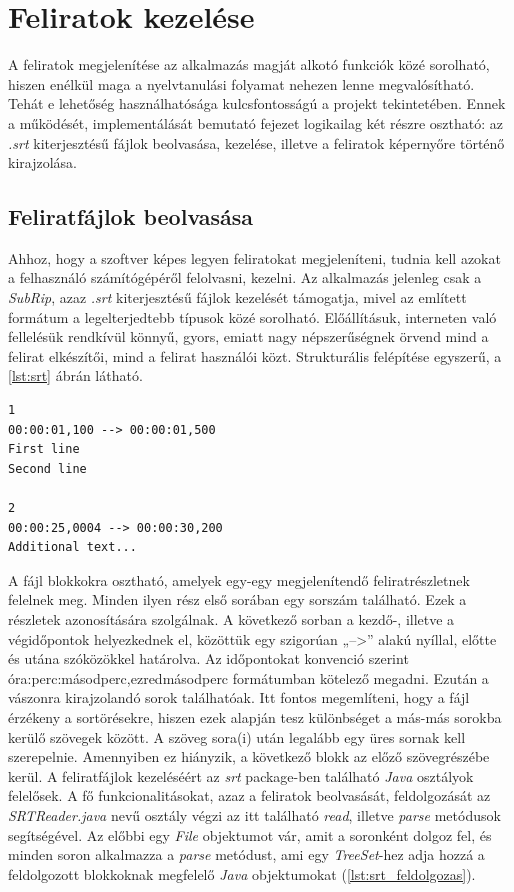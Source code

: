 \section{Feliratok kezelése}
A feliratok megjelenítése az alkalmazás magját alkotó funkciók közé sorolható, hiszen enélkül maga a nyelvtanulási folyamat nehezen lenne megvalósítható. Tehát e lehetőség használhatósága kulcsfontosságú a projekt tekintetében. Ennek a működését, implementálását bemutató fejezet logikailag két részre osztható: az \textit{.srt} kiterjesztésű fájlok beolvasása, kezelése, illetve a feliratok képernyőre történő kirajzolása.

\subsection{Feliratfájlok beolvasása}
Ahhoz, hogy a szoftver képes legyen feliratokat megjeleníteni, tudnia kell azokat a felhasználó számítógépéről felolvasni, kezelni. Az alkalmazás jelenleg csak a \textit{SubRip}, azaz \textit{.srt} kiterjesztésű fájlok kezelését támogatja, mivel az említett formátum a legelterjedtebb típusok közé sorolható. Előállításuk, interneten való fellelésük rendkívül könnyű, gyors, emiatt nagy népszerűségnek örvend mind a felirat elkészítői, mind a felirat használói közt. Strukturális felépítése egyszerű, a \ref{lst:srt} ábrán látható.


\begin{verbatim}
1
00:00:01,100 --> 00:00:01,500
First line
Second line
 
2 
00:00:25,0004 --> 00:00:30,200 
Additional text...
\end{verbatim}

A fájl blokkokra osztható, amelyek egy-egy megjelenítendő feliratrészletnek felelnek meg. Minden ilyen rész első sorában egy sorszám található. Ezek a részletek azonosítására szolgálnak. A következő sorban a kezdő-, illetve a végidőpontok helyezkednek el, közöttük egy szigorúan „-->” alakú nyíllal, előtte és utána szóközökkel határolva. Az időpontokat konvenció szerint óra:perc:másodperc,ezredmásodperc formátumban kötelező megadni. Ezután a vászonra kirajzolandó sorok találhatóak. Itt fontos megemlíteni, hogy a fájl érzékeny a sortörésekre, hiszen ezek alapján tesz különbséget a más-más sorokba kerülő szövegek között. A szöveg sora(i) után legalább egy üres sornak kell szerepelnie. Amennyiben ez hiányzik, a következő blokk az előző szövegrészébe kerül.
A feliratfájlok kezeléséért az \textit{srt} package-ben található \textit{Java} osztályok felelősek. A fő funkcionalitásokat, azaz a feliratok beolvasását, feldolgozását az \textit{SRTReader.java} nevű osztály végzi az itt található \textit{read}, illetve \textit{parse} metódusok segítségével. Az előbbi egy \textit{File} objektumot vár, amit a soronként dolgoz fel, és minden soron alkalmazza a \textit{parse} metódust, ami egy \textit{TreeSet}-hez adja hozzá a feldolgozott blokkoknak megfelelő \textit{Java} objektumokat (\ref{lst:srt_feldolgozas}).

